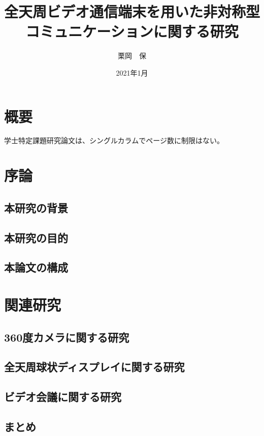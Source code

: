 \documentclass[a4j,11pt,oneside,openany,report]{jsbook}
\title{全天周ビデオ通信端末を用いた非対称型コミュニケーションに関する研究}
\author{栗岡　保}
\affiliation{東京工業大学\\情報理工学院\\情報工学系}
\date{2021年1月}
\begin{document}
\frontmatter
\maketitle

\chapter{概要}
学士特定課題研究論文は、シングルカラムでページ数に制限はない。

\tableofcontents
\listoffigures
\listoftables


\mainmatter
\chapter{序論}

\section{本研究の背景}
\section{本研究の目的}
\section{本論文の構成}

\chapter{関連研究}
\section{360度カメラに関する研究}
\section{全天周球状ディスプレイに関する研究}
\section{ビデオ会議に関する研究}
\section{まとめ}
\end{document}
